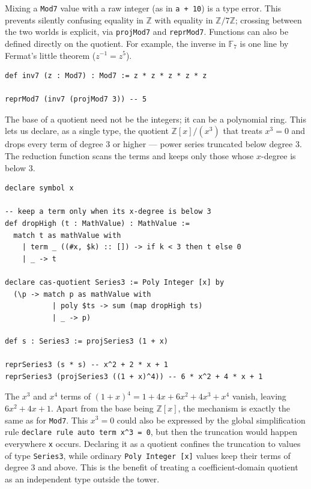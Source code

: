 Mixing a \lstinline{Mod7} value with a raw integer (as in \lstinline{a + 10}) is a type error.
This prevents silently confusing equality in $\mathbb{Z}$ with equality in $\mathbb{Z}/7\mathbb{Z}$; crossing between the two worlds is explicit, via \lstinline{projMod7} and \lstinline{reprMod7}.
Functions can also be defined directly on the quotient.
For example, the inverse in $\mathbb{F}_7$ is one line by Fermat's little theorem ($z^{-1} = z^5$).
\begin{lstlisting}[language=egison,numbers=none]
def inv7 (z : Mod7) : Mod7 := z * z * z * z * z

reprMod7 (inv7 (projMod7 3)) -- 5
\end{lstlisting}

The base of a quotient need not be the integers; it can be a polynomial ring.
This lets us declare, as a single type, the quotient $\mathbb{Z}[x]/(x^3)$ that treats $x^3 = 0$ and drops every term of degree $3$ or higher --- power series truncated below degree $3$.
The reduction function scans the terms and keeps only those whose $x$-degree is below $3$.
\begin{lstlisting}[language=egison,numbers=none]
declare symbol x

-- keep a term only when its x-degree is below 3
def dropHigh (t : MathValue) : MathValue :=
  match t as mathValue with
    | term _ ((#x, $k) :: []) -> if k < 3 then t else 0
    | _ -> t

declare cas-quotient Series3 := Poly Integer [x] by
  (\p -> match p as mathValue with
           | poly $ts -> sum (map dropHigh ts)
           | _ -> p)

def s : Series3 := projSeries3 (1 + x)

reprSeries3 (s * s) -- x^2 + 2 * x + 1
reprSeries3 (projSeries3 ((1 + x)^4)) -- 6 * x^2 + 4 * x + 1
\end{lstlisting}
The $x^3$ and $x^4$ terms of $(1 + x)^4 = 1 + 4x + 6x^2 + 4x^3 + x^4$ vanish, leaving $6x^2 + 4x + 1$.
Apart from the base being $\mathbb{Z}[x]$, the mechanism is exactly the same as for \lstinline{Mod7}.
This $x^3 = 0$ could also be expressed by the global simplification rule \lstinline{declare rule auto term x^3 = 0}, but then the truncation would happen everywhere \lstinline{x} occurs.
Declaring it as a quotient confines the truncation to values of type \lstinline{Series3}, while ordinary \lstinline{Poly Integer [x]} values keep their terms of degree $3$ and above.
This is the benefit of treating a coefficient-domain quotient as an independent type outside the tower.

